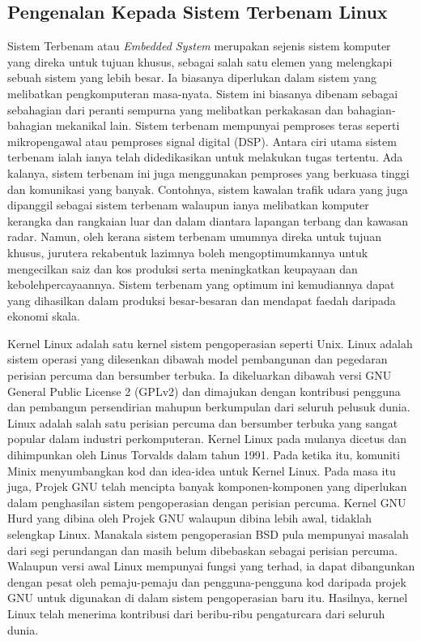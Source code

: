 \subsection{Pengenalan Kepada Sistem Terbenam Linux}%
Sistem Terbenam atau \textit{Embedded System} merupakan sejenis sistem komputer yang direka untuk tujuan khusus, sebagai salah satu elemen yang melengkapi sebuah sistem yang lebih besar. Ia biasanya diperlukan dalam sistem yang melibatkan pengkomputeran masa-nyata. Sistem ini biasanya dibenam sebagai sebahagian dari peranti sempurna yang melibatkan perkakasan dan bahagian-bahagian mekanikal lain. Sistem terbenam mempunyai pemproses teras seperti mikropengawal atau pemproses signal digital (DSP). Antara ciri utama sistem terbenam ialah ianya telah didedikasikan untuk melakukan tugas tertentu. Ada kalanya, sistem terbenam ini juga menggunakan pemproses yang berkuasa tinggi dan komunikasi yang banyak. Contohnya, sistem kawalan trafik udara yang juga dipanggil sebagai sistem terbenam walaupun ianya melibatkan komputer kerangka dan rangkaian luar dan dalam diantara lapangan terbang dan kawasan radar. Namun, oleh kerana sistem terbenam umumnya direka untuk tujuan khusus, jurutera rekabentuk lazimnya boleh mengoptimumkannya untuk mengecilkan saiz dan kos produksi serta meningkatkan keupayaan dan kebolehpercayaannya. Sistem terbenam yang optimum ini kemudiannya dapat yang dihasilkan dalam produksi besar-besaran dan mendapat faedah daripada ekonomi skala.

Kernel Linux adalah satu kernel sistem pengoperasian seperti Unix. Linux adalah sistem operasi yang dilesenkan dibawah model pembangunan dan pegedaran perisian percuma dan bersumber terbuka. Ia dikeluarkan dibawah versi GNU General Public License 2 (GPLv2) dan dimajukan dengan kontribusi pengguna dan pembangun persendirian mahupun berkumpulan dari seluruh pelusuk dunia. Linux adalah salah satu perisian percuma dan bersumber terbuka yang sangat popular dalam industri perkomputeran. Kernel Linux pada mulanya dicetus dan dihimpunkan oleh Linus Torvalds dalam tahun 1991. Pada ketika itu, komuniti Minix menyumbangkan kod dan idea-idea untuk Kernel Linux. Pada masa itu juga, Projek GNU telah mencipta banyak komponen-komponen yang diperlukan dalam penghasilan sistem pengoperasian dengan perisian percuma. Kernel GNU Hurd yang dibina oleh Projek GNU walaupun dibina lebih awal, tidaklah selengkap Linux. Manakala sistem pengoperasian BSD pula mempunyai masalah dari segi perundangan dan masih belum dibebaskan sebagai perisian percuma. Walaupun versi awal Linux mempunyai fungsi yang terhad, ia dapat dibangunkan dengan pesat oleh pemaju-pemaju dan pengguna-pengguna kod daripada projek GNU untuk digunakan di dalam sistem pengoperasian baru itu. Hasilnya, kernel Linux telah menerima kontribusi dari beribu-ribu pengaturcara dari seluruh dunia.

